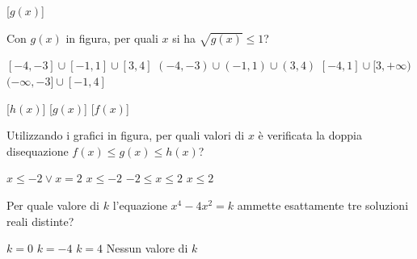 \documentclass[10pt]{article}
\begin{document}
\smallskip
\noindent
\begin{minipage}[c]{.35\linewidth}
  \centering
  \begin{ftplot}[quiz, xmin=-4.9, xmax=4.9, ymin=-1.9, ymax=2.4, ytick={-1,0,1,2},
                 minor tick num=1, legend pos=north west]
    [$g(x)$]
  \end{ftplot}
\end{minipage}\hfill
\begin{minipage}[c]{.64\linewidth}
  \begin{parts}[ragged]
    \itemx[pts=0.5, diff=2] Con $g(x)$ in figura, per quali $x$ si ha $\sqrt{g(x)} \leq 1$?
      \begin{choices}[cols=1]
        \correct $[-4, -3] \cup [-1, 1] \cup [3, 4]$
        \choice $(-4, -3) \cup (-1, 1) \cup (3, 4)$
        \choice $[-4, 1] \cup [3, +\infty)$
        \choice $(-\infty, -3] \cup [-1, 4]$
      \end{choices}
  \end{parts}
\end{minipage}

\smallskip
\noindent
\begin{minipage}[c]{.35\linewidth}
  \centering
  \begin{ftplot}[quiz, xmin=-3.9, xmax=3.9, ymin=-3.9, ymax=4.9, legend style={at={(0.5,0.97)}, anchor=north}]
    [$h(x)$]
    [$g(x)$]
    [$f(x)$]
  \end{ftplot}
\end{minipage}\hfill
\begin{minipage}[c]{.64\linewidth}
  \begin{parts}[ragged]
    \itemx[pts=0.5, diff=2] Utilizzando i grafici in figura, per quali valori di $x$ è verificata la doppia disequazione $f(x) \leq g(x) \leq h(x)$?
      \begin{choices}
        \correct $x \leq -2 \lor x = 2$
        \choice $x \leq -2$
        \choice $-2 \leq x \leq 2$
        \choice $x \leq 2$
      \end{choices}
  \end{parts}
\end{minipage}

\begin{parts}
  \pagebreak
  \itemx[pts=0.5, diff=2] Per quale valore di $k$ l'equazione $x^4 - 4x^2 = k$ ammette esattamente tre soluzioni reali distinte?
    \begin{choices}
      \correct $k = 0$
      \choice $k = -4$
      \choice $k = 4$
      \choice[fixed] Nessun valore di $k$
    \end{choices}
\end{parts}
\end{document}
